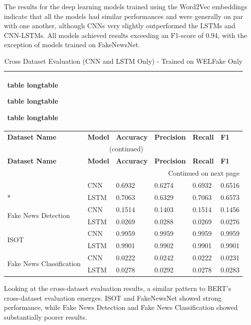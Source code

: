 \documentclass[stu,12pt,floatsintext,donotrepeattitle]{apa7}
\makeatletter
\let\origcaption\caption
\newcommand{\@tabletype}{table}
\newcommand{\@longtabletype}{longtable}
\DeclareRobustCommand{\caption}[2][]{%
    \ifx\relax#1\relax
      \origcaption{#2}%
      \def\temp@cap{#2}%
    \else
      \origcaption[#1]{#2}%
      \def\temp@cap{#1}%
    \fi
    \ifx\@captype\@tabletype
      \ifx\@currenvir\@longtabletype\else
        \addcontentsline{lot}{table}{\protect\numberline{\thetable}{\ignorespaces\temp@cap}}%
      \fi
    \fi
  }%
\let\oldcaption\caption
\renewcommand{\caption}[2][]{%
    \oldcaption[#1]{#2}%
    \vspace{-12pt}%
  }%
\makeatother
\begin{document}
The results for the deep learning models trained using the Word2Vec embeddings indicate that all the models had similar performances and were generally on par with one another, although CNNs very slightly outperformed the LSTMs and CNN-LSTMs. All models achieved results exceeding an F1-score of 0.94, with the exception of models trained on FakeNewsNet. 

\vspace{25pt}

\begingroup
\setlength{\tabcolsep}{3pt}
\renewcommand{\arraystretch}{1.3}
\setlength\LTleft{\fill}
\setlength\LTright{\fill}
\begin{longtable}{@{} p{4.7cm} p{2.0cm} p{1.7cm} p{1.7cm} p{1.7cm} p{1.7cm} @{}}
\caption{Cross Dataset Evaluation (CNN and LSTM Only) - Trained on WELFake Only} \label{tab:dl_cross_results} \\
\toprule
\textbf{Dataset Name} & \textbf{Model} & \textbf{Accuracy} & \textbf{Precision} & \textbf{Recall} & \textbf{F1} \\
\midrule
\endfirsthead

\multicolumn{6}{c}{\normalsize\tablename\ \thetable{} (continued)} \\
\toprule
\textbf{Dataset Name} & \textbf{Model} & \textbf{Accuracy} & \textbf{Precision} & \textbf{Recall} & \textbf{F1} \\
\midrule
\endhead

\bottomrule
\multicolumn{6}{r}{{Continued on next page}} \\
\endfoot

\bottomrule
\endlastfoot
\multirow{2}{*}{FakeNewsNet} & CNN & 0.6932 & 0.6274 & 0.6932 & 0.6516 \\*
 & LSTM & 0.7063 & 0.6329 & 0.7063 & 0.6573 \\
\midrule
\multirow{2}{*}{Fake News Detection} & CNN & 0.1514 & 0.1403 & 0.1514 & 0.1456 \\*
 & LSTM & 0.0269 & 0.0288 & 0.0269 & 0.0276 \\
\midrule
\multirow{2}{*}{ISOT} & CNN & 0.9959 & 0.9959 & 0.9959 & 0.9959 \\*
 & LSTM & 0.9901 & 0.9902 & 0.9901 & 0.9901 \\
\midrule
\multirow{2}{*}{Fake News Classification} & CNN & 0.0222 & 0.0242 & 0.0222 & 0.0231 \\*
 & LSTM & 0.0278 & 0.0292 & 0.0278 & 0.0283 \\
\bottomrule
\end{longtable}
\endgroup

Looking at the cross-dataset evaluation results, a similar pattern to BERT's cross-dataset evaluation emerges. ISOT and FakeNewsNet showed strong performance, while Fake News Detection and Fake News Classification showed substantially poorer results.
\end{document}
